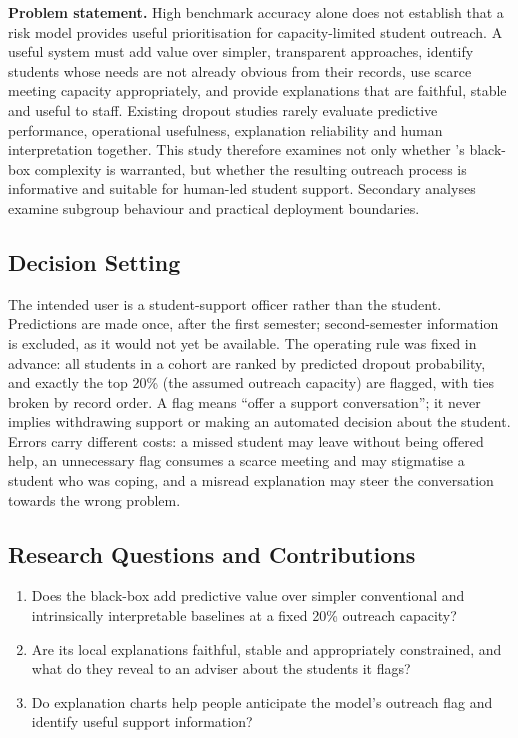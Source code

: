 \textbf{Problem statement.} High benchmark accuracy alone does not establish that a risk model
provides useful prioritisation for capacity-limited student outreach. A useful system must add value
over simpler, transparent approaches, identify students whose needs are not already obvious from
their records, use scarce
meeting capacity appropriately, and provide explanations that are faithful, stable and useful to
staff. Existing dropout studies rarely evaluate predictive performance, operational usefulness,
explanation reliability and human interpretation together. This study therefore examines not only
whether \tabicl's black-box complexity is warranted, but whether the resulting outreach process is
informative and suitable for human-led student support. Secondary analyses examine subgroup
behaviour and practical deployment boundaries.

\subsection{Decision Setting}

The intended user is a student-support officer rather than the student. Predictions are made once,
after the first semester; second-semester information is excluded, as it would not yet be
available. The operating rule was fixed in advance: all students in a cohort are ranked by
predicted dropout probability, and exactly the top 20\% (the assumed outreach capacity) are flagged,
with ties broken by record order. A flag means ``offer a support conversation''; it never implies
withdrawing support or making an automated decision about the student. Errors carry different
costs: a missed student may leave without being offered help, an unnecessary flag consumes a scarce
meeting and may stigmatise a student who was coping, and a misread explanation may steer the
conversation towards the wrong problem.

\subsection{Research Questions and Contributions}

\begin{enumerate}[nosep,leftmargin=*]
  \item[\textbf{RQ1.}] Does the black-box \tabicl add predictive value over simpler conventional
  and intrinsically interpretable baselines at a fixed 20\% outreach capacity?
  \item[\textbf{RQ2.}] Are its local explanations faithful, stable and appropriately constrained,
  and what do they reveal to an adviser about the students it flags?
  \item[\textbf{RQ3.}] Do explanation charts help people anticipate the model's outreach flag and
  identify useful support information?
\end{enumerate}

